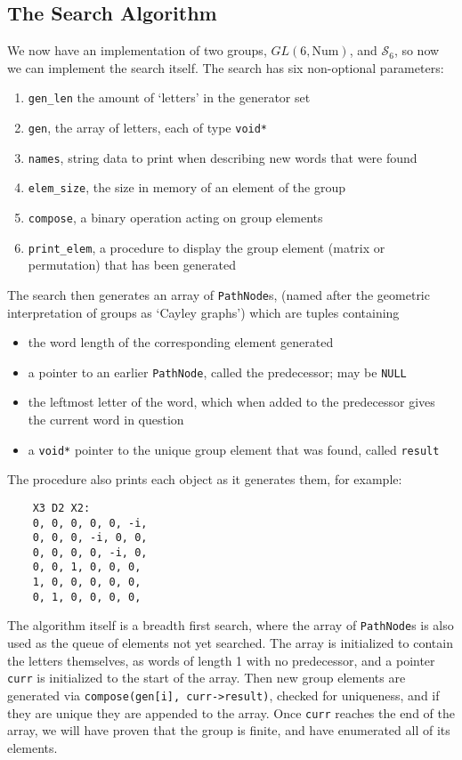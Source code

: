\subsection{The Search Algorithm}
We now have an implementation of two groups, $GL(6, \text{Num})$, and $\mathcal{S}_6$, so now we can implement the search itself. The search has six non-optional parameters:
\begin{enumerate}
	\item \verb`gen_len` the amount of `letters' in the generator set
	\item \verb`gen`, the array of letters, each of type \verb`void*`
	\item \verb`names`, string data to print when describing new words that were found
	\item \verb`elem_size`, the size in memory of an element of the group
	\item \verb`compose`, a binary operation acting on group elements
	\item \verb`print_elem`, a procedure to display the group element (matrix or permutation) that has been generated
\end{enumerate}
The search then generates an array of \verb`PathNode`s, (named after the geometric interpretation of groups as `Cayley graphs') which are tuples containing
\begin{itemize}
	\item the word length of the corresponding element generated
	\item a pointer to an earlier \verb`PathNode`, called the predecessor; may be \verb`NULL`
	\item the leftmost letter of the word, which when added to the predecessor gives the current word in question
	\item a \verb`void*` pointer to the unique group element that was found, called \verb`result`
\end{itemize}
The procedure also prints each object as it generates them, for example:
\begin{verbatim}
	X3 D2 X2:
	0, 0, 0, 0, 0, -i, 
	0, 0, 0, -i, 0, 0, 
	0, 0, 0, 0, -i, 0, 
	0, 0, 1, 0, 0, 0, 
	1, 0, 0, 0, 0, 0, 
	0, 1, 0, 0, 0, 0, 
\end{verbatim}

The algorithm itself is a breadth first search, where the array of \verb`PathNode`s is also used as the queue of elements not yet searched. The array is initialized to contain the letters themselves, as words of length 1 with no predecessor, and a pointer \verb`curr` is initialized to the start of the array. Then new group elements are generated via \verb`compose(gen[i], curr->result)`, checked for uniqueness, and if they are unique they are appended to the array. Once \verb`curr` reaches the end of the array, we will have proven that the group is finite, and have enumerated all of its elements.

